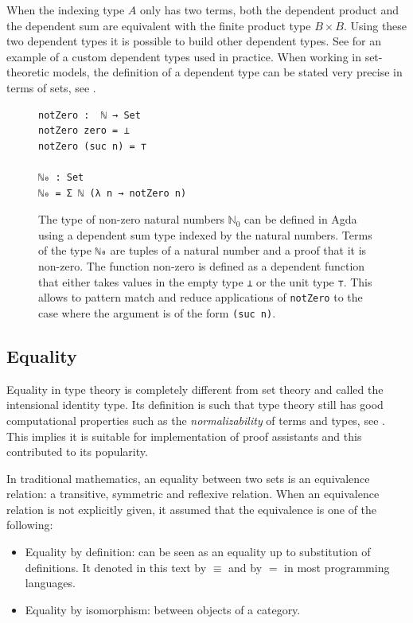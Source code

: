 \documentclass[12pt,a4paper,twoside,xetex]{book} %
\newcommand{\keyword}[1]{\emph{#1}\index{#1}}
\begin{document}
When the indexing type $A$ only has two terms, both the dependent product and the dependent sum 
are equivalent with the finite product type $B \times B$. Using these two 
dependent types it is possible to build other dependent types. See 
 for an example of a custom dependent types used in practice. 
When working in set-theoretic models, the definition of a dependent type can be 
stated very precise in terms of sets, see .

\begin{figure}\label{non-zeroNats}
\centering
\begin{BVerbatim}
notZero :  ℕ → Set
notZero zero = ⊥
notZero (suc n) = ⊤

ℕ₀ : Set
ℕ₀ = Σ ℕ (λ n → notZero n)
\end{BVerbatim}
\caption{The type of non-zero natural numbers $\mathbb{N}_0$ can be defined in 
Agda using a dependent sum type indexed by the natural numbers. Terms of the 
type \texttt{ℕ₀} are tuples of a natural number and a proof that it is 
non-zero. The function non-zero is defined as a dependent function that either takes values in the empty type \texttt{⊥} or the unit type \texttt{⊤}. This allows to pattern match and reduce applications of \texttt{notZero} to the case where the argument is of the form \texttt{(suc n)}.}
\end{figure}


\subsection{Equality}

Equality in type theory is completely different from set theory and called the intensional identity type. Its definition is such that type theory still has good computational properties such as the \keyword{normalizability} of terms and types, see . This implies it is suitable for implementation of proof assistants and this contributed to its popularity. 

In traditional mathematics, an equality between two sets is an equivalence relation: a transitive, symmetric and reflexive relation. When an equivalence relation is not explicitly given, it assumed that the equivalence is one of the following: 

\begin{itemize}
 \item Equality by definition: can be seen as an equality up to substitution 
of definitions. It denoted in this text by $\equiv$ and by $=$ in most programming languages.
 \item Equality by isomorphism: between objects of a category.
\end{itemize}
\end{document}

